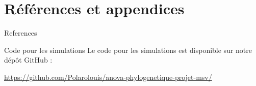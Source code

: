 \documentclass[10pt]{beamer}\usepackage[]{graphicx}\usepackage[]{xcolor}
\newcommand{\themename}{\textbf{\textsc{metropolis}}\xspace}
\begin{document}
\section{Références et appendices}
\begin{frame}[allowframebreaks]{References}

    \printbibliography

\end{frame}

\appendix

\begin{frame}[allowframebreaks]{Code pour les simulations}
 Le code pour les simulations est disponible sur notre dépôt GitHub : \\
\begin{center}
    \url{https://github.com/Polarolouis/anova-phylogenetique-projet-msv/}
\end{center}
\end{frame}







  

\end{document}

